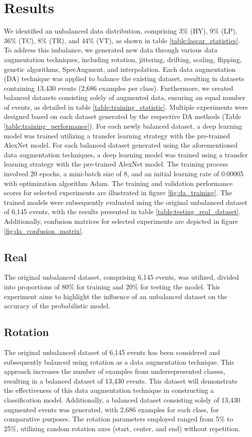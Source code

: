 \documentclass[journal]{IEEEtran}
\begin{document}
\section{Results}\label{results}
We identified an unbalanced data distribution, comprising 3\% (HY), 9\% (LP), 36\% (TC), 8\% (TR), and 44\% (VT), as shown in table \ref{table:lascar_statistics}. To address this imbalance, we generated new data through various data augmentation techniques, including rotation, jittering, drifting, scaling, flipping, genetic algorithms, SpecAugment, and interpolation. Each data augmentation (DA) technique was applied to balance the existing dataset, resulting in datasets containing 13,430 events (2,686 examples per class). Furthermore, we created balanced datasets consisting solely of augmented data, ensuring an equal number of events, as detailed in table \ref{table:training_statistic}.
Multiple experiments were designed based on each dataset generated by the respective DA methods (Table \ref{table:training_performance}). For each newly balanced dataset, a deep learning model was trained utilizing a transfer learning strategy with the pre-trained AlexNet model. For each balanced dataset generated using the aforementioned data augmentation techniques, a deep learning model was trained using a transfer learning strategy with the pre-trained AlexNet model. The training process involved 20 epochs, a mini-batch size of 8, and an initial learning rate of 0.00005 with optimization algorithm Adam. The training and validation performance scores for selected experiments are illustrated in figure \ref{fig:da_training}. The trained models were subsequently evaluated using the original unbalanced dataset of 6,145 events, with the results presented in table \ref{table:testing_real_dataset}. Additionally, confusion matrices for selected experiments are depicted in figure \ref{fig:da_confusion_matrix}.

\subsection{Real}
The original unbalanced dataset, comprising 6,145 events, was utilized, divided into proportions of 80\% for training and 20\% for testing the model. This experiment aims to highlight the influence of an unbalanced dataset on the accuracy of the probabilistic model.
\subsection{Rotation}
The original unbalanced dataset of 6,145 events has been considered and subsequently balanced using rotation as a data augmentation technique. This approach increases the number of examples from underrepresented classes, resulting in a balanced dataset of 13,430 events. This dataset will demonstrate the effectiveness of this data augmentation technique in constructing a classification model.
Additionally, a balanced dataset consisting solely of 13,430 augmented events was generated, with 2,686 examples for each class, for comparative purposes.
The rotation parameters employed ranged from 5\% to 25\%, utilizing random rotation axes (start, center, and end) without repetition.
\end{document}
